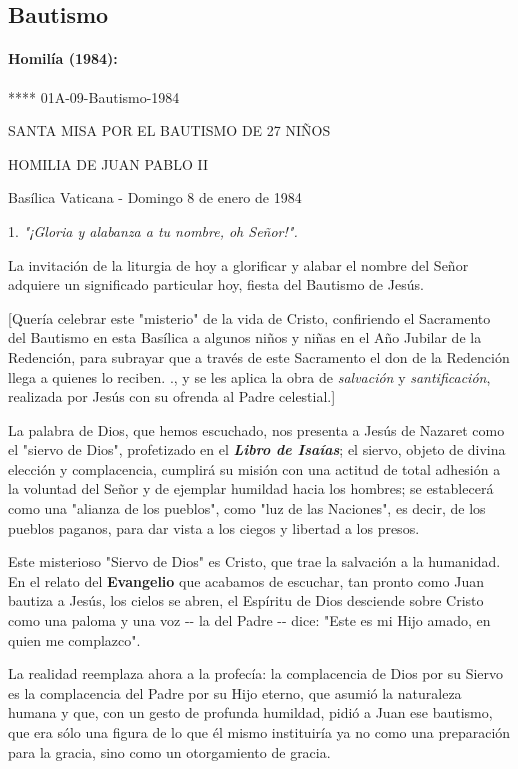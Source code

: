 \begin{body}
\chapter{Bautismo}

\subsubsection{Homilía (1984): } **** 01A-09-Bautismo-1984

SANTA MISA POR EL BAUTISMO DE 27 NIÑOS

HOMILIA DE JUAN PABLO II

Basílica Vaticana - Domingo 8 de enero de 1984

1. \emph{"¡Gloria y alabanza a tu nombre, oh Señor!".}

La invitación de la liturgia de hoy a glorificar y alabar el nombre del Señor adquiere un significado particular hoy, fiesta del Bautismo de Jesús.

{[}Quería celebrar este "misterio" de la vida de Cristo, confiriendo el Sacramento del Bautismo en esta Basílica a algunos niños y niñas en el Año Jubilar de la Redención, para subrayar que a través de este Sacramento el don de la Redención llega a quienes lo reciben. ., y se les aplica la obra de \emph{salvación} y \emph{santificación}, realizada por Jesús con su ofrenda al Padre celestial.{]}

La palabra de Dios, que hemos escuchado, nos presenta a Jesús de Nazaret como el "siervo de Dios", profetizado en el \emph{\textbf{Libro de Isaías}}; el siervo, objeto de divina elección y complacencia, cumplirá su misión con una actitud de total adhesión a la voluntad del Señor y de ejemplar humildad hacia los hombres; se establecerá como una "alianza de los pueblos", como "luz de las Naciones", es decir, de los pueblos paganos, para dar vista a los ciegos y libertad a los presos.

Este misterioso "Siervo de Dios" es Cristo, que trae la salvación a la humanidad. En el relato del \textbf{Evangelio} que acabamos de escuchar, tan pronto como Juan bautiza a Jesús, los cielos se abren, el Espíritu de Dios desciende sobre Cristo como una paloma y una voz -\/- la del Padre -\/- dice: "Este es mi Hijo amado, en quien me complazco".

La realidad reemplaza ahora a la profecía: la complacencia de Dios por su Siervo es la complacencia del Padre por su Hijo eterno, que asumió la naturaleza humana y que, con un gesto de profunda humildad, pidió a Juan ese bautismo, que era sólo una figura de lo que él mismo instituiría ya no como una preparación para la gracia, sino como un otorgamiento de gracia.


\end{body}
